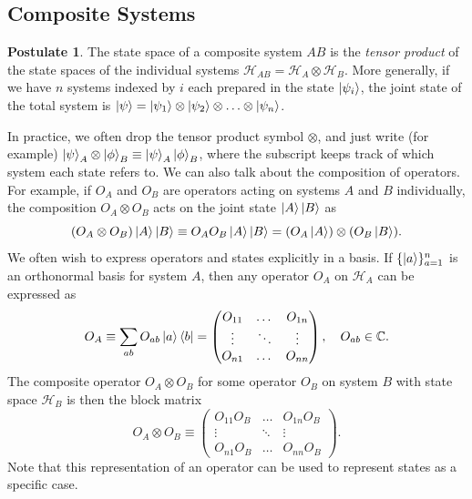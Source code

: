 \documentclass[12pt,a4paper]{report}
\numberwithin{equation}{section}
\newcommand{\ketbra}[2]{\ket{#1}\bra{#2}}
\theoremstyle{definition}
\theoremstyle{theorem}
\theoremstyle{theorem}
\theoremstyle{example}
\theoremstyle{definition}
\newtheorem{postulate}{Postulate}
\begin{document}
\subsection{Composite Systems}
\begin{postulate}
	The state space of a composite system $AB$ is the \textit{tensor product} of the state spaces of the individual systems $\mathcal{H}_{AB}=\mathcal{H}_{A}\otimes\mathcal{H}_{B}$. More generally, if we have $n$ systems indexed by $i$ each prepared in the state $\ket{\psi_{i}}$, the joint state of the total system is $\ket{\psi}=\ket{\psi_{1}}\otimes\ket{\psi_{2}}\otimes\ldots\otimes\ket{\psi_{n}}$.
\end{postulate}
In practice, we often drop the tensor product symbol $\otimes$, and just write (for example) $\ket{\psi}_{A}\otimes\ket{\phi}_{B}\equiv\ket{\psi}_{A}\ket{\phi}_{B}$, where the subscript keeps track of which system each state refers to. We can also talk about the composition of operators. For example, if $O_{A}$ and $O_{B}$ are operators acting on systems $A$ and $B$ individually, the composition $O_{A}\otimes O_{B}$ acts on the joint state $\ket{A}\ket{B}$ as
\begin{equation}
	(O_{A}\otimes O_{B})\ket{A}\ket{B}\equiv O_{A}O_{B}\ket{A}\ket{B}=(O_{A}\ket{A})\otimes(O_{B} \ket{B}).
\end{equation}
We often wish to express operators and states explicitly in a basis. If $\{\ket{a}\}_{a=1}^{n}$ is an orthonormal basis for system $A$, then any operator $O_{A}$ on $\mathcal{H}_{A}$ can be expressed as
\begin{equation}
	O_{A}\equiv \sum_{ab}O_{ab}\ketbra{a}{b}=\begin{pmatrix}
		O_{11}&\dots&O_{1n}\\
		\vdots&\ddots&\vdots\\
		O_{n1}&\dots&O_{nn}
	\end{pmatrix},\quad O_{ab}\in\mathbb{C}.
\end{equation}
The composite operator $O_{A}\otimes O_{B}$ for some operator $O_{B}$ on system $B$ with state space $\mathcal{H}_{B}$ is then the block matrix
\begin{equation}
	O_{A}\otimes O_{B}\equiv\begin{pmatrix}
		O_{11}O_{B}&\dots&O_{1n}O_{B}\\
		\vdots&\ddots&\vdots\\
		O_{n1}O_{B}&\dots&O_{nn}O_{B}
	\end{pmatrix}.
\end{equation}
Note that this representation of an operator can be used to represent states as a specific case. 
\end{document}
